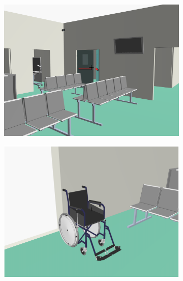 \documentclass[]{egpubl}
\begin{document}
\begin{figure}[htbp]
\begin{subfigure}[b]{0.165\textwidth}
   \includegraphics[width=\textwidth]{images/emergency/4}
   \end{subfigure}
\hspace{-1.5mm}   
   \begin{subfigure}[b]{0.165\textwidth}
   \includegraphics[width=\textwidth]{images/emergency/5}
   \end{subfigure}
\hspace{-1.5mm}   
   \begin{subfigure}[b]{0.165\textwidth}

\end{subfigure}
\end{figure}
\end{document}
